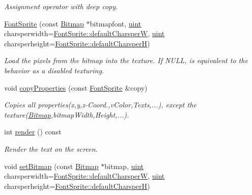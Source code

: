 \begin{DoxyCompactItemize}
\begin{DoxyCompactList}\small\item\em Assignment operator with deep copy. \item\end{DoxyCompactList}\item 
\hyperlink{class_f2_c_1_1_font_sprite_a5c7ad536cebfee0660823bef1947e668}{FontSprite} (const \hyperlink{class_f2_c_1_1_bitmap}{Bitmap} $\ast$bitmapfont, \hyperlink{namespace_f2_c_a58be2bac9eb3e3c99cb41b6008bf4fae}{uint} charsperwidth=\hyperlink{class_f2_c_1_1_font_sprite_a4391313f8fd3a47ae2b9941d8540a098}{FontSprite::defaultCharsperW}, \hyperlink{namespace_f2_c_a58be2bac9eb3e3c99cb41b6008bf4fae}{uint} charsperheight=\hyperlink{class_f2_c_1_1_font_sprite_a2f7ed6629876bb340c5b3121d0c3a2b0}{FontSprite::defaultCharsperH})
\begin{DoxyCompactList}\small\item\em Load the pixels from the bitmap into the texture. If NULL, is equivalent to the behavior as a disabled texturing. \item\end{DoxyCompactList}\item 
void \hyperlink{class_f2_c_1_1_font_sprite_a36a224f59737fb06c4d79ee48b7e4068}{copyProperties} (const \hyperlink{class_f2_c_1_1_font_sprite}{FontSprite} \&copy)
\begin{DoxyCompactList}\small\item\em Copies all properties(x,y,z-\/Coord.,vColor,Texts,...), except the texture(\hyperlink{class_f2_c_1_1_bitmap}{Bitmap},bitmapWidth,Height,...). \item\end{DoxyCompactList}\item 
int \hyperlink{class_f2_c_1_1_font_sprite_a2c6fc77162983dc4d750258144410272}{render} () const 
\begin{DoxyCompactList}\small\item\em Render the text on the screen. \item\end{DoxyCompactList}\item 
void \hyperlink{class_f2_c_1_1_font_sprite_a067445bcf9a95c276413091161066cb1}{setBitmap} (const \hyperlink{class_f2_c_1_1_bitmap}{Bitmap} $\ast$bitmap, \hyperlink{namespace_f2_c_a58be2bac9eb3e3c99cb41b6008bf4fae}{uint} charsperwidth=\hyperlink{class_f2_c_1_1_font_sprite_a4391313f8fd3a47ae2b9941d8540a098}{FontSprite::defaultCharsperW}, \hyperlink{namespace_f2_c_a58be2bac9eb3e3c99cb41b6008bf4fae}{uint} charsperheight=\hyperlink{class_f2_c_1_1_font_sprite_a2f7ed6629876bb340c5b3121d0c3a2b0}{FontSprite::defaultCharsperH})

\end{DoxyCompactItemize}

